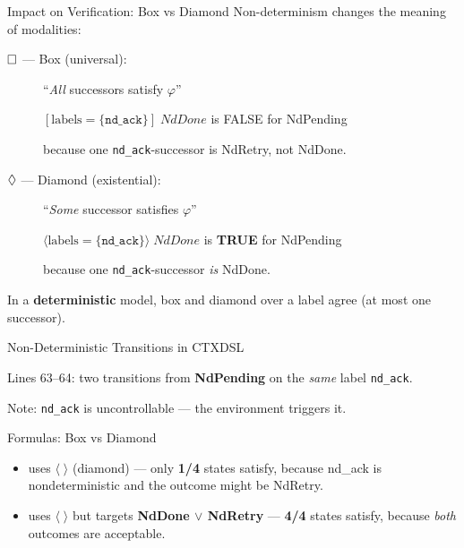 \begin{frame}{Impact on Verification: Box vs Diamond}
  Non-determinism changes the meaning of modalities:

  \bigskip
  \begin{description}
    \item[$\square$ --- Box (universal):] ``\emph{All} successors satisfy $\varphi$''

    \medskip
    $[\text{labels} = \{ \texttt{nd\_ack} \}]\; \textit{NdDone}$ is \alert{FALSE} for NdPending

    because one \texttt{nd\_ack}-successor is NdRetry, not NdDone.

    \bigskip
    \item[$\lozenge$ --- Diamond (existential):] ``\emph{Some} successor satisfies $\varphi$''

    \medskip
    $\langle \text{labels} = \{ \texttt{nd\_ack} \} \rangle\; \textit{NdDone}$ is \textbf{TRUE} for NdPending

    because one \texttt{nd\_ack}-successor \emph{is} NdDone.
  \end{description}

  \bigskip
  In a \textbf{deterministic} model, box and diamond over a label agree (at most one successor).
\end{frame}

\begin{frame}[fragile]{Non-Deterministic Transitions in CTXDSL}
  

  \medskip
  Lines 63--64: two transitions from \textbf{NdPending} on the \emph{same} label \texttt{nd\_ack}.

  Note: \texttt{nd\_ack} is \alert{uncontrollable} --- the environment triggers it.
\end{frame}

\begin{frame}[fragile]{Formulas: Box vs Diamond}
  

  \medskip
  \begin{itemize}
    \item {} uses $\langle\;\rangle$ (diamond) --- only \textbf{1/4} states satisfy, because nd\_ack is nondeterministic and the outcome might be NdRetry.
    \item {} uses $\langle\;\rangle$ but targets \textbf{NdDone $\lor$ NdRetry} --- \textbf{4/4} states satisfy, because \emph{both} outcomes are acceptable.
  \end{itemize}
\end{frame}

